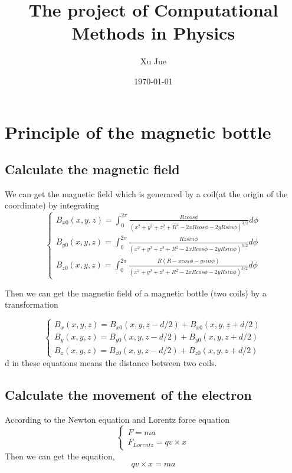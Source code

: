 \documentclass[12pt]{article}
\begin{document}
\title{The project of Computational Methods in Physics}
\author{Xu Jue}
\date{\today}
\maketitle

\section{Principle of the magnetic bottle}
\subsection{Calculate the magnetic field}
\indent

We can get the magnetic field which is generared by a coil(at the origin of the coordinate) by integrating
\begin{equation}
\begin{cases}
        B_{x0}(x,y,z)=\int_0^{2 \pi} \frac{Rzcos \phi}{(x^2+y^2+z^2+R^2-2xRcos \phi-2yRsin \phi)^{3/2}} d\phi\\
        B_{y0}(x,y,z)=\int_0^{2 \pi} \frac{Rzsin \phi}{(x^2+y^2+z^2+R^2-2xRcos \phi-2yRsin \phi)^{3/2}} d\phi\\
        B_{z0}(x,y,z)=\int_0^{2 \pi} \frac{R(R-xcos\phi-ysin\phi)}{(x^2+y^2+z^2+R^2-2xRcos \phi-2yRsin \phi)^{3/2}} d\phi
\end{cases}
\end{equation}


 Then we can get the magnetic field of a magnetic bottle (two coils) by a transformation

 \begin{equation}
 \begin{cases}
        B_{x}(x,y,z)=B_{x0}(x,y,z-d/2)+B_{x0}(x,y,z+d/2)\\
        B_{y}(x,y,z)=B_{y0}(x,y,z-d/2)+B_{y0}(x,y,z+d/2)\\
        B_{z}(x,y,z)=B_{z0}(x,y,z-d/2)+B_{z0}(x,y,z+d/2)
 \end{cases}
 \end{equation}
 d in these equations means the distance between two coils.


\subsection{Calculate the movement of the electron}
According to the Newton equation and Lorentz force equation
\begin{equation}
\begin{cases}
    F=ma\\
    F_{Lorentz}=qv \times x
\end{cases}
\end{equation}
Then we can get the equation,
\begin{equation}
    qv \times x=ma
\end{equation}
\end{document}
